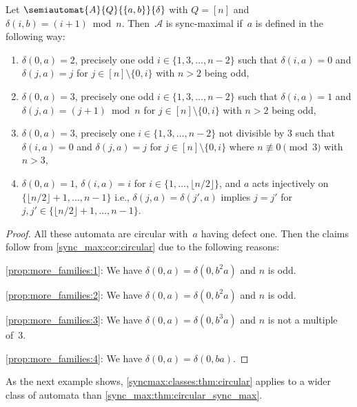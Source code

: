 \begin{proposition}
	\label{prop:more_families}
	Let $\semiautomat{A}{Q}{\{a,b\}}{\delta}$
	with $Q = [n]$ and $\delta(i, b) = (i + 1) \bmod n$.
	Then~$\mathcal A$ is sync-maximal if~$a$ is defined in the following way:
	\begin{enumerate}
		\item \label{prop:more_families:1} $\delta(0, a) = 2$, precisely one odd $i \in \{1,3,\ldots,n-2\}$
		such that $\delta(i, a) = 0$ and $\delta(j, a) = j$ for $j \in [n] \setminus\{0,i\}$ with $n > 2$ being odd,
		
		\item \label{prop:more_families:2} $\delta(0, a) = 3$, precisely one odd $i \in \{1,3,\ldots,n-2\}$
		such that $\delta(i, a) = 1$ and $\delta(j, a) = (j+1) \bmod n$ for $j \in [n] \setminus\{0,i\}$ with $n > 2$ being odd,
		
		\item \label{prop:more_families:3} $\delta(0, a) = 3$, precisely one $i \in \{1,3,\ldots,n-2\}$
		not divisible by $3$ such that $\delta(i, a) = 0$ and $\delta(j, a) = j$ for $j \in [n] \setminus\{0,i\}$ where $n \not\equiv 0 \pmod{3}$ with $n > 3$,
		
		\item \label{prop:more_families:4} $\delta(0,a) = 1$, $\delta(i, a) = i$ for $i \in \{1,\ldots,\lfloor n / 2 \rfloor\}$,
		and $a$ acts injectively on $\{\lfloor n/2 \rfloor + 1, \ldots, n - 1 \}$
		i.e., $\delta(j, a) = \delta(j', a)$ implies $j = j'$ for $j,j' \in \{\lfloor n/2 \rfloor + 1, \ldots, n - 1 \}$.
	\end{enumerate}
\end{proposition}
\begin{proof}
	All these automata are circular with~$a$ having defect one.
	Then the claims follow from \cref{sync_max:cor:circular} due to the following 
	reasons:
	
	\ref{prop:more_families:1}: We have $\delta(0, a) = \delta(0, b^2a)$ and $n$ is odd.
	
	\ref{prop:more_families:2}: We have $\delta(0, a) = \delta(0, b^2a)$ and $n$ is odd.
	
	\ref{prop:more_families:3}: We have $\delta(0, a) = \delta(0, b^3a)$ and $n$ is not a multiple of~$3$.
	
	\ref{prop:more_families:4}: We have $\delta(0, a) = \delta(0, ba)$.
\end{proof}

As the next example shows, \cref{syncmax:classes:thm:circular} applies to a wider 
class of automata than \cref{sync_max:thm:circular_sync_max}.

